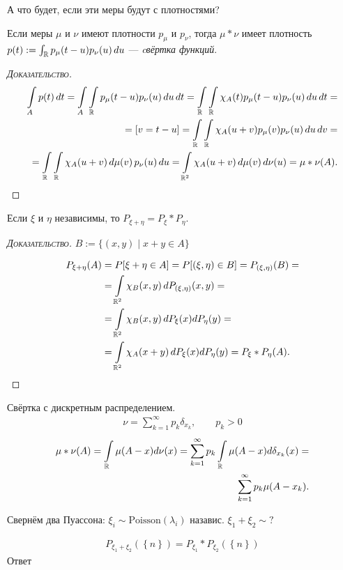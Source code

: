 А что будет, если эти меры будут с плотностями?

\begin{thm}
 Если меры $ \mu $ и $ \nu $ имеют плотности $ p_{\mu} $ и $ p_{\nu} $, тогда $ \mu \ast \nu $ имеет плотность $ p(t) := \int_{\mathbb{R}} p_{\mu}(t-u)p_{\nu}(u)\,du  $ --- \textit{cвёртка функций}.
\end{thm}
\begin{proof}[\normalfont\textsc{Доказательство}]
 \begin{align*}
  \int\limits_{A} p(t)\,dt = \int\limits_{A} \int\limits_{\mathbb{R}} p_{\mu}(t-u)p_{\nu}(u)\,du\,dt = \int\limits_{\mathbb{R}} \int\limits_{\mathbb{R}} \chi_A(t)p_{\mu} (t-u)p_{\nu}(u)\,du\,dt = \\
  = [v = t - u] = \int\limits_{\mathbb{R}} \int\limits_{\mathbb{R}} \chi_{A}(u+v) p_{\mu}(v) p_{\nu}(u) \, du\,dv = \\
  = \int\limits_{\mathbb{R}} \int\limits_{\mathbb{R}} \chi_A(u+v)\,d\mu(v)\,p_{\nu}(u)\,du = \int\limits_{\mathbb{R}^{2}} \chi_A(u+v)\,d\mu(v)\,d\nu(u) = \mu \ast \nu(A).   
 \end{align*} 
\end{proof}

\begin{thm}
 Если $ \xi $ и $ \eta $ независимы, то $ P_{\xi + \eta} = P_\xi \ast P_\eta $.
\end{thm}
\begin{proof}[\normalfont\textsc{Доказательство}]
	$B := \{(x, y) \mid x + y \in A \}$ 

 \begin{align*}
  P_{\xi+\eta}(A) &= P[\xi + \eta \in A] = P[(\xi,\eta)\in B] = P_{(\xi,\eta)}(B) = \\
  &= \int\limits_{\mathbb{R}^{2}} \chi_B(x,y) \,dP_{(\xi,\eta)}(x,y) = \\
  &= \int\limits_{\mathbb{R}^{2}} \chi_B(x,y)\,dP_\xi(x)dP_\eta(y) = \\ 
  &= \int\limits_{\mathbb{R}^{2}} \chi_A(x+y) \,dP_\xi(x)dP_\eta(y) = P_{\xi} \ast P_{\eta}(A).
 \end{align*} 
\end{proof}

\begin{exmpl}
 Свёртка с дискретным распределением.
  \begin{align*}
   \nu = \sum_{k=1}^{\infty} p_k \delta_{x_k}, \qquad p_k > 0
 \end{align*} 
 \begin{align*}
  \mu \ast \nu(A) = \int\limits_{\mathbb{R}} \mu(A - x) d\nu(x) = \sum_{k=1}^{\infty} p_k \int\limits_{\mathbb{R}} \mu(A-x) d \delta_{x_k}(x) = \\
  \sum_{k=1}^{\infty}p_k\mu(A-x_k).
 \end{align*} 
\end{exmpl}
\begin{exmpl}
 Свернём два Пуассона: $ \xi_i \sim \mathrm{Poisson}(\lambda_i) $ назавис. $ \xi_1 + \xi_2 \sim ? $

 \begin{align*}
  P_{\xi_1 + \xi_2}(\left\{ n \right\}) = P_{\xi_1} \ast P_{\xi_2}(\left\{ n \right\})
 \end{align*} Ответ 
  
\end{exmpl}

